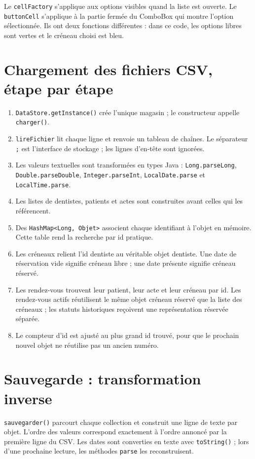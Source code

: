 \documentclass[11pt,a4paper]{report}
\begin{document}
Le \texttt{cellFactory} s'applique aux options visibles quand la liste est ouverte. Le \texttt{buttonCell} s'applique à la partie fermée du ComboBox qui montre l'option sélectionnée. Ils ont deux fonctions différentes : dans ce code, les options libres sont vertes et le créneau choisi est bleu.

\section{Chargement des fichiers CSV, étape par étape}
\begin{enumerate}
\item \texttt{DataStore.getInstance()} crée l'unique magasin ; le constructeur appelle \texttt{charger()}.
\item \texttt{lireFichier} lit chaque ligne et renvoie un tableau de chaînes. Le séparateur \texttt{;} est l'interface de stockage ; les lignes d'en-tête sont ignorées.
\item Les valeurs textuelles sont transformées en types Java : \texttt{Long.parseLong}, \texttt{Double.parseDouble}, \texttt{Integer.parseInt}, \texttt{LocalDate.parse} et \texttt{LocalTime.parse}.
\item Les listes de dentistes, patients et actes sont construites avant celles qui les référencent.
\item Des \texttt{HashMap<Long, Objet>} associent chaque identifiant à l'objet en mémoire. Cette table rend la recherche par id pratique.
\item Les créneaux relient l'id dentiste au véritable objet dentiste. Une date de réservation vide signifie créneau libre ; une date présente signifie créneau réservé.
\item Les rendez-vous trouvent leur patient, leur acte et leur créneau par id. Les rendez-vous actifs réutilisent le même objet créneau réservé que la liste des créneaux ; les statuts historiques reçoivent une représentation réservée séparée.
\item Le compteur d'id est ajusté au plus grand id trouvé, pour que le prochain nouvel objet ne réutilise pas un ancien numéro.
\end{enumerate}

\section{Sauvegarde : transformation inverse}
\texttt{sauvegarder()} parcourt chaque collection et construit une ligne de texte par objet. L'ordre des valeurs correspond exactement à l'ordre annoncé par la première ligne du CSV. Les dates sont converties en texte avec \texttt{toString()} ; lors d'une prochaine lecture, les méthodes \texttt{parse} les reconstruisent.
\end{document}
